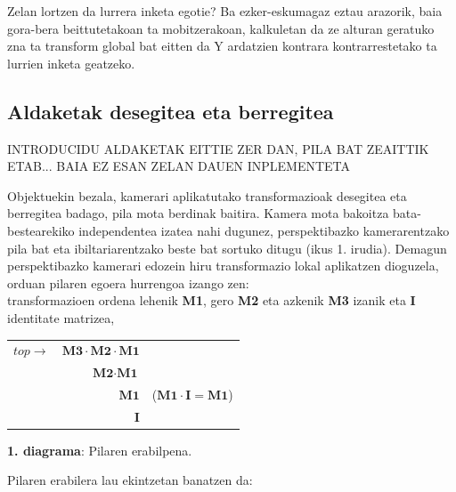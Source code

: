 \documentclass[12pt]{article}
\begin{document}
Zelan lortzen da lurrera inketa egotie? Ba ezker-eskumagaz eztau arazorik, baia gora-bera beittutetakoan ta mobitzerakoan, kalkuletan da ze alturan geratuko zna ta transform global bat eitten da Y ardatzien kontrara kontrarrestetako ta lurrien inketa geatzeko.

\subsection{Aldaketak desegitea eta berregitea}

INTRODUCIDU ALDAKETAK EITTIE ZER DAN, PILA BAT ZEAITTIK ETAB... BAIA EZ ESAN ZELAN DAUEN INPLEMENTETA

Objektuekin bezala, kamerari aplikatutako transformazioak desegitea eta berregitea badago, pila mota berdinak baitira. Kamera mota bakoitza bata-bestearekiko independentea izatea nahi dugunez, perspektibazko kamerarentzako pila bat eta ibiltariarentzako beste bat sortuko ditugu (ikus 1. irudia). Demagun perspektibazko kamerari edozein hiru transformazio lokal aplikatzen dioguzela, orduan pilaren egoera hurrengoa izango zen:\\
transformazioen ordena lehenik \textbf{M1}, gero \textbf{M2} eta azkenik \textbf{M3} izanik eta \textbf{I} identitate matrizea,

\begin{center}
\begin{tabular}{r|r|r}
 \cline{2-2}
 $top \rightarrow$ & $\textbf{M3} \cdot \textbf{M2} \cdot \textbf{M1}$ & \\
 \cline{2-2}
 & $\textbf{M2} \cdot \textbf{M1}$ & \\
 \cline{2-2}
 & $\textbf{M1}$ & \hspace{0.5cm} ($\textbf{M1} \cdot \textbf{I} = \textbf{M1}$) \\
 \cline{2-2}
 & $\textbf{I}$ & \\
 \cline{2-2}
\end{tabular}

\textbf{1. diagrama}: Pilaren erabilpena.
\end{center}

Pilaren erabilera lau ekintzetan banatzen da:
\end{document}
